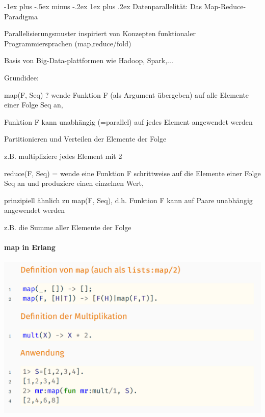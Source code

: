 \documentclass[10pt]{article}
\makeatletter
\renewcommand{\subsubsection}{\@startsection{subsubsection}{3}{0mm}%
                                {-1ex plus -.5ex minus -.2ex}%
                                {1ex plus .2ex}%
                                {\normalfont\small\bfseries}}
\makeatother
\begin{document}
  \subsubsection{Datenparallelität: Das Map-Reduce-Paradigma}
  \begin{itemize*}
    \item Parallelisierungsmuster inspiriert von Konzepten funktionaler Programmiersprachen (map,reduce/fold)
    \item Basis von Big-Data-plattformen wie Hadoop, Spark,...
    \item Grundidee:
    \begin{itemize*}
      \item map(F, Seq) ? wende Funktion F (als Argument übergeben) auf alle Elemente einer Folge Seq an,
      \begin{itemize*}
        \item Funktion F kann unabhängig (=parallel) auf jedes Element angewendet werden
        \item Partitionieren und Verteilen der Elemente der Folge
        \item z.B. multipliziere jedes Element mit 2
      \end{itemize*}
      \item reduce(F, Seq) = wende eine Funktion F schrittweise auf die Elemente einer Folge Seq an und produziere einen einzelnen Wert,
      \begin{itemize*}
        \item prinzipiell ähnlich zu map(F, Seq), d.h. Funktion F kann auf Paare unabhängig angewendet werden
        \item z.B. die Summe aller Elemente der Folge
      \end{itemize*}
    \end{itemize*}
  \end{itemize*}
  
  \paragraph{map in Erlang}
  
  \begin{center}
    \includegraphics[width=0.4\linewidth]{Assets/Programmierparadigmen-erlang-map}
  \end{center}
  
\end{document}
